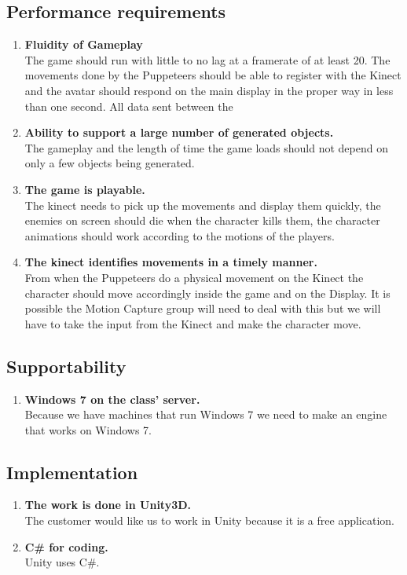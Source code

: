 \documentclass[10pt,letterpaper,oneside,english]{article}
\begin{document}
\subsection{Performance requirements}
\begin{enumerate}
\item \textbf{Fluidity of Gameplay} \\ The game should run with little to no lag at a framerate of at least 20. The movements done by the Puppeteers should be able to register with the Kinect and the avatar should respond on the main display in the proper way in less than one second. All data sent between the   
\item \textbf{Ability to support a large number of generated objects.} \\
The gameplay and the length of time the game loads should not depend on only a few objects being generated.

\item \textbf{The game is playable.} \\ The kinect needs to pick up the movements and display them quickly, the enemies on screen should die when the character kills them, the character animations should work according to the motions of the players.

\item \textbf{The kinect identifies movements in a timely manner.} \\ From when the Puppeteers do a physical movement on the Kinect the character should move accordingly inside the game and on the Display. It is possible the Motion Capture group will need to deal with this but we will have to take the input from the Kinect and make the character move.
\end{enumerate}
\subsection{Supportability}
\begin{enumerate}
\item \textbf{Windows 7 on the class’ server.} \\ Because we have machines that run Windows 7 we need to make an engine that works on Windows 7.

\end{enumerate}
\subsection{Implementation}
\begin{enumerate}
\item \textbf{The work is done in Unity3D.} \\ The customer would like us to work in Unity because it is a free application.
\item \textbf{C\# for coding.} \\ Unity uses C\#.
\end{enumerate}
\end{document}
